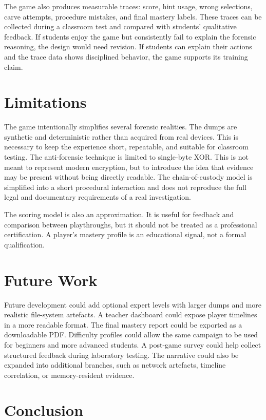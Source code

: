 \documentclass[11pt,a4paper]{article}
\begin{document}
The game also produces measurable traces: score, hint usage, wrong selections, carve attempts, procedure mistakes, and final mastery labels. These traces can be collected during a classroom test and compared with students' qualitative feedback. If students enjoy the game but consistently fail to explain the forensic reasoning, the design would need revision. If students can explain their actions and the trace data shows disciplined behavior, the game supports its training claim.

\section{Limitations}

The game intentionally simplifies several forensic realities. The dumps are synthetic and deterministic rather than acquired from real devices. This is necessary to keep the experience short, repeatable, and suitable for classroom testing. The anti-forensic technique is limited to single-byte XOR. This is not meant to represent modern encryption, but to introduce the idea that evidence may be present without being directly readable. The chain-of-custody model is simplified into a short procedural interaction and does not reproduce the full legal and documentary requirements of a real investigation.

The scoring model is also an approximation. It is useful for feedback and comparison between playthroughs, but it should not be treated as a professional certification. A player's mastery profile is an educational signal, not a formal qualification.

\section{Future Work}

Future development could add optional expert levels with larger dumps and more realistic file-system artefacts. A teacher dashboard could expose player timelines in a more readable format. The final mastery report could be exported as a downloadable PDF. Difficulty profiles could allow the same campaign to be used for beginners and more advanced students. A post-game survey could help collect structured feedback during laboratory testing. The narrative could also be expanded into additional branches, such as network artefacts, timeline correlation, or memory-resident evidence.

\section{Conclusion}
\end{document}
